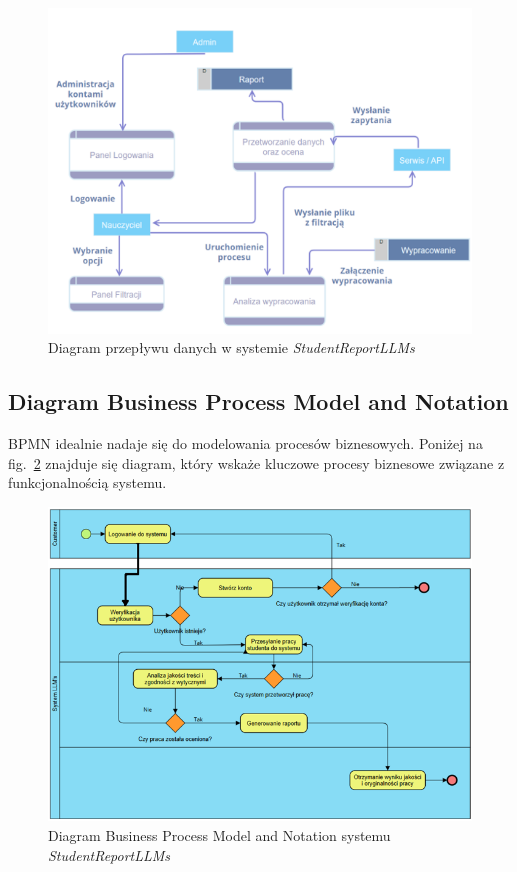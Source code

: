 \documentclass[a4paper, 12pt]{article}
\begin{document}
\begin{figure}[H]
    \centering
    \includegraphics[width=\textwidth]{img/DFD}
    \caption{Diagram przepływu danych w systemie \textit{StudentReportLLMs}}
    \label{fig:dfd}
\end{figure}

\subsection{Diagram Business Process Model and Notation}
BPMN idealnie nadaje się do modelowania procesów biznesowych.
Poniżej na fig.~\ref{fig:BPMN} znajduje się diagram, który wskaże kluczowe procesy biznesowe związane z funkcjonalnością systemu.

\begin{figure}[H]
    \centering
    \includegraphics[width=\textwidth]{img/BPMN}
    \caption{Diagram Business Process Model and Notation systemu \textit{StudentReportLLMs}}
    \label{fig:BPMN}
\end{figure}
\end{document}
